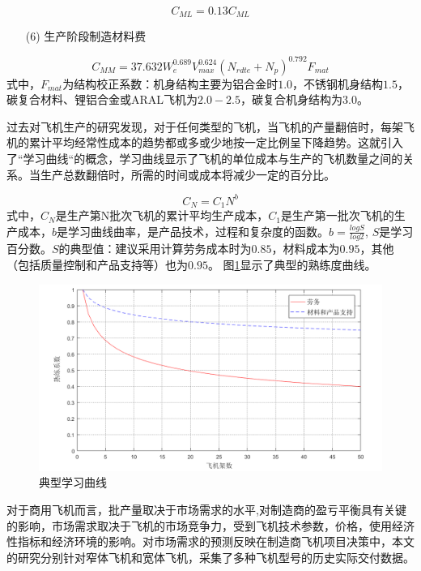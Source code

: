 \documentclass[12pt,a4paper]{report}
\begin{document}
\begin{equation}
\label{eq:manufacturingQ}
C_{ML}=0.13C_{ML}
\end{equation}
\begin{itemize}
    \item[(6)] 生产阶段制造材料费
\end{itemize}
\begin{equation}
\label{eq:manufacturingM}
C_{MM}=37.632W_e^ {0.689}V_{max} ^ {0.624}(N_{rdte} + N_p) ^ {0.792}F_{mat}
\end{equation}
式中，$F_{mat}$为结构校正系数：机身结构主要为铝合金时$1.0$，不锈钢机身结构$1.5$，碳复合材料、锂铝合金或ARAL飞机为$2.0-2.5$，碳复合机身结构为$3.0$。

过去对飞机生产的研究发现，对于任何类型的飞机，当飞机的产量翻倍时，每架飞机的累计平均经常性成本的趋势都或多或少地按一定比例呈下降趋势。这就引入了“学习曲线“的概念，学习曲线显示了飞机的单位成本与生产的飞机数量之间的关系。当生产总数翻倍时，所需的时间或成本将减少一定的百分比。

\begin{equation}
\label{learningcurve}
C_{N}=C_{1}N^b
\end{equation}
式中，$C_{N}$是生产第N批次飞机的累计平均生产成本，$C_{1}$是生产第一批次飞机的生产成本，$b$是学习曲线曲率，是产品技术，过程和复杂度的函数。$b=\frac{log S}{log 2}$, $S$是学习百分数。$S$的典型值：建议采用计算劳务成本时为$0.85$，材料成本为$0.95$，其他（包括质量控制和产品支持等）也为$0.95$。 图\ref{fig:learningcurve}显示了典型的熟练度曲线。
\begin{figure}[!htp]
  \centering
  \includegraphics[width=.8\textwidth]{eps/learningcurve.png}
  \caption{典型学习曲线}
 \label{fig:learningcurve}
\end{figure}

对于商用飞机而言，批产量取决于市场需求的水平,对制造商的盈亏平衡具有关键的影响，市场需求取决于飞机的市场竞争力，受到飞机技术参数，价格，使用经济性指标和经济环境的影响。对市场需求的预测反映在制造商飞机项目决策中，本文的研究分别针对窄体飞机和宽体飞机，采集了多种飞机型号的历史实际交付数据。
\end{document}
